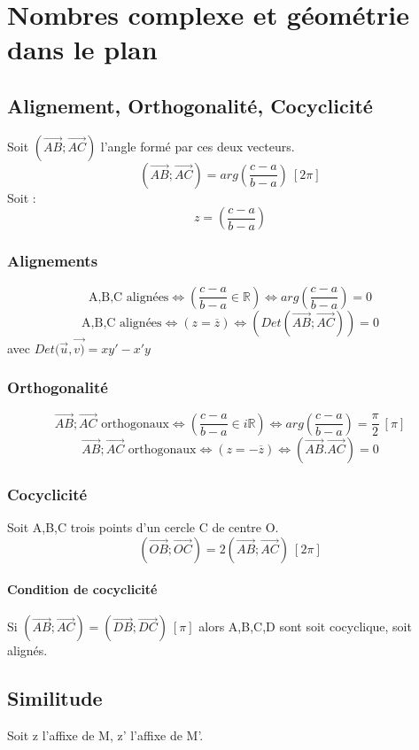 \chapter{Nombres complexe et géométrie dans le plan}
\section{Alignement, Orthogonalité, Cocyclicité}
Soit $(\overrightarrow{AB};\overrightarrow{AC})$ l'angle formé par ces deux vecteurs.
$$(\overrightarrow{AB};\overrightarrow{AC}) = arg\left(\dfrac{c-a}{b-a}\right) ~ [2\pi]$$
Soit :$$z = \left(\dfrac{c-a}{b-a}\right) $$
\subsection{Alignements}
$$\mbox{A,B,C alignées} \Leftrightarrow \left(\dfrac{c-a}{b-a} \in \mathbb{R} \right) \Leftrightarrow arg\left(\dfrac{c-a}{b-a}\right) = 0  $$
$$\mbox{A,B,C alignées} \Leftrightarrow (z = \overline{z}) \Leftrightarrow (Det(\overrightarrow{AB};\overrightarrow{AC})) = 0$$
avec $Det(\overrightarrow{u},\overrightarrow{v)} = xy' - x'y$ 
\subsection{Orthogonalité}
$$\overrightarrow{AB};\overrightarrow{AC} \mbox{ orthogonaux} \Leftrightarrow \left(\dfrac{c-a}{b-a} \in i\mathbb{R} \right) \Leftrightarrow arg\left(\dfrac{c-a}{b-a}\right) = \dfrac{\pi}{2}~ [\pi]  $$
$$\overrightarrow{AB};\overrightarrow{AC} \mbox{ orthogonaux} \Leftrightarrow (z = -\overline{z}) \Leftrightarrow (\overrightarrow{AB}.\overrightarrow{AC}) = 0$$
\subsection{Cocyclicité}
Soit A,B,C trois points d'un cercle C de centre O.
$$(\overrightarrow{OB};\overrightarrow{OC}) = 2(\overrightarrow{AB};\overrightarrow{AC})~ [2\pi]$$
\subsubsection{Condition de cocyclicité}
\begin{prop}
 Si $(\overrightarrow{AB};\overrightarrow{AC}) = (\overrightarrow{DB};\overrightarrow{DC})~ [\pi]$ alors A,B,C,D sont soit cocyclique, soit alignés.
\end{prop}
\section{Similitude}
Soit z l'affixe de M, z' l'affixe de M'.
